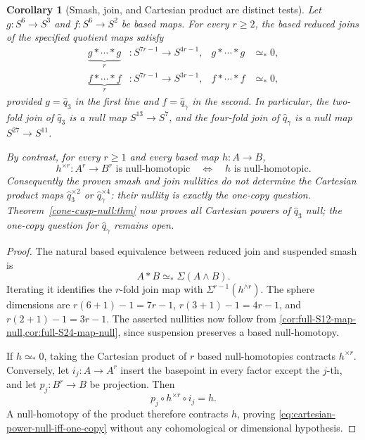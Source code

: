 \documentclass[11pt,letterpaper]{article}
\numberwithin{equation}{section}
\newtheorem{corollary}[theorem]{Corollary}
\theoremstyle{definition}
\theoremstyle{remark}
\begin{document}
\begin{corollary}[Smash, join, and Cartesian product are distinct tests]
\label{cor:smash-join-product-separation}
Let \(g:S^6\to S^3\) and \(f:S^6\to S^2\) be based maps.  For every
\(r\geq2\), the based reduced joins of the specified quotient maps satisfy
\begin{align*}
 \underbrace{g*\cdots*g}_{r} &:S^{7r-1}\longrightarrow S^{4r-1},
 &g*\cdots*g&\simeq_*0,\\
 \underbrace{f*\cdots*f}_{r} &:S^{7r-1}\longrightarrow S^{3r-1},
 &f*\cdots*f&\simeq_*0,
\end{align*}
provided \(g=\widehat q_3\) in the first line and
\(f=\widehat q_\gamma\) in the second.  In particular, the two-fold join
of \(\widehat q_3\) is a null map \(S^{13}\to S^7\), and the four-fold
join of \(\widehat q_\gamma\) is a null map \(S^{27}\to S^{11}\).

By contrast, for every \(r\geq1\) and every based map \(h:A\to B\),
\begin{equation}
 h^{\times r}:A^r\longrightarrow B^r\text{ is null-homotopic}
 \quad\Longleftrightarrow\quad h\text{ is null-homotopic}.
 \label{eq:cartesian-power-null-iff-one-copy}
\end{equation}
Consequently the proven smash and join nullities do not determine the
Cartesian product maps
\(\widehat q_3^{\times2}\) or \(\widehat q_\gamma^{\times4}\): their
nullity is exactly the one-copy question. Theorem~\ref{cone-cusp-null:thm}
now proves all Cartesian powers of \(\widehat q_3\) null; the
one-copy question for \(\widehat q_\gamma\) remains open.
\end{corollary}

\begin{proof}
The natural based equivalence between reduced join and suspended smash is
\[
 A*B\simeq_*\Sigma(A\wedge B).
\]
Iterating it identifies the \(r\)-fold join map with
\(\Sigma^{r-1}(h^{\wedge r})\).  The sphere dimensions are
\(r(6+1)-1=7r-1\), \(r(3+1)-1=4r-1\), and
\(r(2+1)-1=3r-1\).  The asserted nullities now follow from
\cref{cor:full-S12-map-null,cor:full-S24-map-null}, since suspension
preserves a based null-homotopy.

If \(h\simeq_*0\), taking the Cartesian product of \(r\) based
null-homotopies contracts \(h^{\times r}\).  Conversely, let
\(i_j:A\to A^r\) insert the basepoint in every factor except the \(j\)-th,
and let \(p_j:B^r\to B\) be projection.  Then
\[
 p_j\circ h^{\times r}\circ i_j=h.
\]
A null-homotopy of the product therefore contracts \(h\), proving
\cref{eq:cartesian-power-null-iff-one-copy} without any cohomological or
dimensional hypothesis.
\end{proof}
\end{document}
